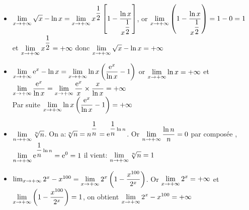\begin{example}

\begin{itemize}
\item $\displaystyle \lim_{x \to +\infty} \sqrt{x}-\ln x =\displaystyle\lim_{x \to +\infty}x^{\dfrac{1}{2}}\left[ 1-\dfrac{\ln x}{x^{\dfrac{1}{2}}} \right]$,   or $\displaystyle \displaystyle\lim_{x \to +\infty}\left(1-\dfrac{\ln x}{x^{\dfrac{1}{2}}}\right) =1-0=1 $     et $ \displaystyle\lim_{x \to +\infty}x^{\dfrac{1}{2}}=+\infty $     donc $\displaystyle\lim_{x \to +\infty} \sqrt{x}-\ln x=+\infty  $  
\item $\displaystyle\lim_{x \to +\infty}\mathrm{e}^{x} -\ln x =\displaystyle\lim_{x \to +\infty}\ln x\left(\dfrac{\mathrm{e}^{x}}{\ln x} -1\right)$     or $\displaystyle \lim_{x \to +\infty}\ln x=+\infty $    et $\displaystyle \lim_{x \to +\infty}\dfrac{\mathrm{e}^{x}}{\ln x}= \displaystyle \lim_{x \to +\infty}\dfrac{\mathrm{e}^{x}}{ x}\times\frac{x}{\ln x} =+\infty$ \\ Par suite $\displaystyle \lim_{x \to +\infty}\ln x\left(\dfrac{\mathrm{e}^{x}}{\ln x} -1\right)=+\infty $ 
\item $\displaystyle \lim_{n \to +\infty} \sqrt[n]{n} $. \;    On a:\;$\sqrt[n]{n}=n^{\dfrac{1}{n}}  =\mathrm{e}^{\dfrac{1}{n}\ln n} $.\;   Or $ \displaystyle\lim_{n \to +\infty}\dfrac{\ln n}{n} =0$\;     par  composée , $ \displaystyle \lim_{n \to +\infty} \mathrm{e}^{\dfrac{1}{n}\ln n}=\mathrm{e}^{0}=1$   il vient: $ \displaystyle\lim_{n \to +\infty} \sqrt[n]{n}=1 $  
\item  $ \lim_{x \to +\infty} 2^{x}-x^{100} =\displaystyle\lim_{x \to +\infty}2^{x}\left(1-\dfrac{x^{100}}{2^{x}}\right)$.
Or $ \displaystyle\lim_{x \to +\infty} 2^{x}=+\infty $  \; et \; $\displaystyle \lim_{x \to +\infty}\left(1-\dfrac{x^{100}}{2^{x}}\right) = 1$,\;    on obtient \; $ \displaystyle\lim_{x \to +\infty} 2^{x}-x^{100} =+\infty $

\end{itemize}

\end{example}


